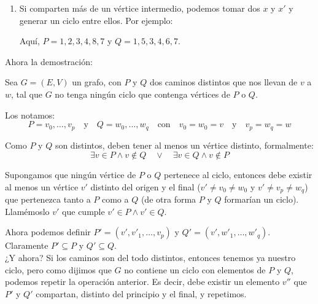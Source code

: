 \documentclass{article}
\begin{document}
\begin{enumerate}
\begin{enumerate}
        \item Si comparten más de un vértice intermedio, podemos tomar dos $x$ y $x'$ y generar un ciclo entre ellos. Por ejemplo:
        \begin{center}
        \end{center}
        Aquí, $P = 1,2,3,4,8,7$ y $Q = 1,5,3,4,6,7$.
    \end{enumerate}
\end{enumerate}
\newpage
Ahora la demostración:

Sea $G = (E,V)$ un grafo, con $P$ y $Q$ dos caminos distintos que nos llevan de $v$ a $w$, tal que $G$ no tenga ningún ciclo que contenga vértices de $P$ o $Q$.

Los notamos: 
\[ P = v_0, \ldots, v_p \quad \text{y} \quad Q = w_0, \ldots, w_q \quad \text{con} \quad v_0 = w_0 = v \quad \text{y} \quad v_p = w_q = w \]

Como $P$ y $Q$ son distintos, deben tener al menos un vértice distinto, formalmente:
\[ \exists v \in P \land v \notin Q \quad \lor \quad \exists v \in Q \land v \notin P \]

Supongamos que ningún vértice de $P$ o $Q$ pertenece al ciclo, entonces debe existir al menos un vértice $v'$ distinto del origen y el final ($v' \neq v_0 \neq w_0$ y $v' \neq v_p \neq w_q$) que pertenezca tanto a $P$ como a $Q$ (de otra forma $P$ y $Q$ formarían un ciclo). Llamémoslo $v'$ que cumple $v' \in P \land v' \in Q$.

Ahora podemos definir $P' = (v',v'_1 , \ldots , v_p)$ y $Q' = (v',w'_1, \ldots , w'_q)$. Claramente $P' \subseteq P$ y $Q' \subseteq Q$.\\

¿Y ahora? Si los caminos son del todo distintos, entonces tenemos ya nuestro ciclo, pero como dijimos que $G$ no contiene un ciclo con elementos de $P$ y $Q$, podemos repetir la operación anterior. Es decir, debe existir un elemento $v''$ que $P'$ y $Q'$ compartan, distinto del principio y el final, y repetimos.\\
\end{document}

